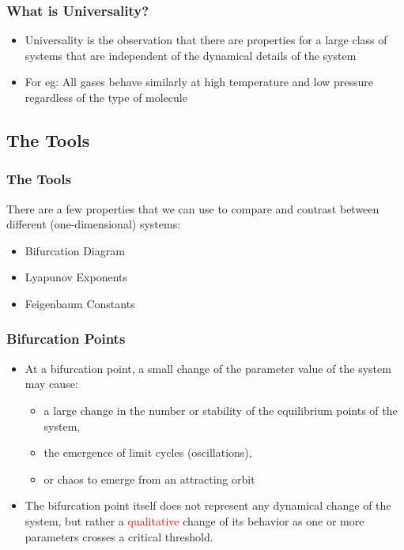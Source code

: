 \documentclass[
	11pt, %
	aspectratio=169, %
]{beamer}
\begin{document}
\begin{frame}
	\frametitle{What is Universality?}
	
	\begin{itemize}
        \item Universality is the observation that there are properties for a large class of systems that are independent of the dynamical details of the system \pause
        \item For eg: All gases behave similarly at high temperature and low pressure regardless of the type of molecule
    \end{itemize}

\end{frame}


\subsection{The Tools}

\begin{frame}
	\frametitle{The Tools}
	There are a few properties that we can use to compare and contrast between different (one-dimensional) systems: \pause
    \begin{itemize}
        \item Bifurcation Diagram \pause
        \item Lyapunov Exponents \pause
        \item Feigenbaum Constants
    \end{itemize}

\end{frame}


\begin{frame}
	\frametitle{Bifurcation Points}
    \begin{itemize}
        \item At a bifurcation point, a small change of the parameter value of the system may cause:
        \begin{itemize}
            \item a large change in the number or stability of the equilibrium points of the system,
            \item the emergence of limit cycles (oscillations),
            \item or chaos to emerge from an attracting orbit
        \end{itemize} \pause
        \item The bifurcation point itself does not represent any dynamical change of the system, but rather a \textcolor{red}{qualitative} change of its behavior as one or more parameters crosses a critical threshold.
    \end{itemize}
\end{frame}
\end{document}
